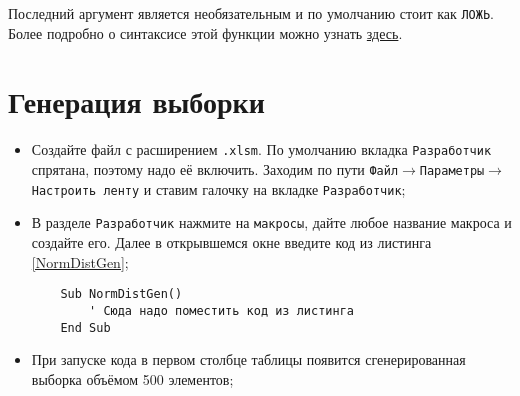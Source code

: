 \documentclass[14pt,a4paper]{article}
\begin{document}
Последний аргумент является необязательным и по умолчанию стоит как \texttt{ЛОЖЬ}. Более подробно о синтаксисе этой функции можно узнать \href{https://support.microsoft.com/ru-ru/office/%D1%84%D1%83%D0%BD%D0%BA%D1%86%D0%B8%D1%8F-%D0%BD%D0%BE%D1%80%D0%BC-%D1%80%D0%B0%D1%81%D0%BF-edb1cc14-a21c-4e53-839d-8082074c9f8d}{здесь}.

\progress{}

\section{Генерация выборки}
\noindent\begin{itemize}
	\item Создайте файл с расширением \texttt{.xlsm}. По умолчанию вкладка \texttt{Разработчик} спрятана, поэтому надо её включить. Заходим по пути \texttt{Файл$\rightarrow$Параметры$\rightarrow$Настроить ленту} и ставим галочку на вкладке \texttt{Разработчик};
	\item В разделе \texttt{Разработчик} нажмите на \texttt{макросы}, дайте любое название макроса и создайте его. Далее в открывшемся окне введите код из листинга \ref{NormDistGen};
	\begin{lstlisting} 
	Sub NormDistGen()
		' Сюда надо поместить код из листинга
	End Sub  
	\end{lstlisting}
	\item При запуске кода в первом столбце таблицы появится сгенерированная выборка объёмом 500 элементов;
\end{itemize}
\end{document}
